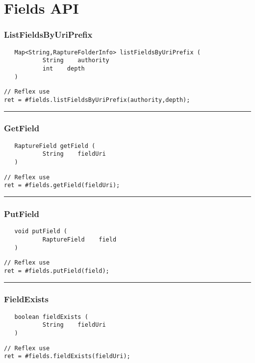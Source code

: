 \section{Fields API}

\subsubsection{ListFieldsByUriPrefix}
\label{Api:ListFieldsByUriPrefix}
\begin{verbatim}
   Map<String,RaptureFolderInfo> listFieldsByUriPrefix (
           String    authority
           int    depth
   )
\end{verbatim}
\begin{lstlisting}[language=reflex]
// Reflex use
ret = #fields.listFieldsByUriPrefix(authority,depth);
\end{lstlisting}



\rule{15cm}{2pt}
\subsubsection{GetField}
\label{Api:GetField}
\begin{verbatim}
   RaptureField getField (
           String    fieldUri
   )
\end{verbatim}
\begin{lstlisting}[language=reflex]
// Reflex use
ret = #fields.getField(fieldUri);
\end{lstlisting}



\rule{15cm}{2pt}
\subsubsection{PutField}
\label{Api:PutField}
\begin{verbatim}
   void putField (
           RaptureField    field
   )
\end{verbatim}
\begin{lstlisting}[language=reflex]
// Reflex use
ret = #fields.putField(field);
\end{lstlisting}



\rule{15cm}{2pt}
\subsubsection{FieldExists}
\label{Api:FieldExists}
\begin{verbatim}
   boolean fieldExists (
           String    fieldUri
   )
\end{verbatim}
\begin{lstlisting}[language=reflex]
// Reflex use
ret = #fields.fieldExists(fieldUri);
\end{lstlisting}



